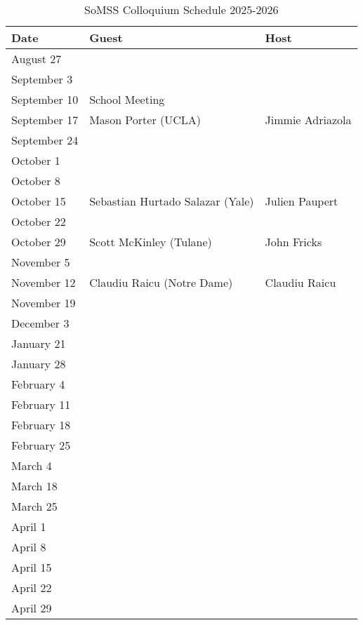 \documentclass[11pt]{article}
\begin{document}
\begin{table}[htp]
\caption{SoMSS Colloquium Schedule 2025-2026}
\begin{center}
\begin{tabular}{|l|l|l|}
\hline
Date & Guest & Host\\
\hline
August 27 &&\\
September 3 &&\\
September 10 &School Meeting&\\
September 17 & Mason Porter (UCLA) & Jimmie Adriazola \\
September 24 &&\\
October 1 && \\
October 8 &&\\
October 15 &Sebastian Hurtado Salazar (Yale)& Julien Paupert\\
October 22 &&\\
October 29 &Scott McKinley (Tulane)& John Fricks\\
November 5 &&\\
November 12 &Claudiu Raicu (Notre Dame)& Claudiu Raicu \\
November 19 && \\
December 3 && \\
January 21 && \\
January 28 &&\\
February 4 && \\
February 11 && \\
February 18 &&\\
February 25 && \\
March 4 &&\\
March 18 && \\
March 25 && \\
April 1 && \\
April 8 &&\\
April 15 && \\
April 22 && \\
April 29 && \\
\hline
\end{tabular}
\end{center}
\end{table}%
\end{document}
